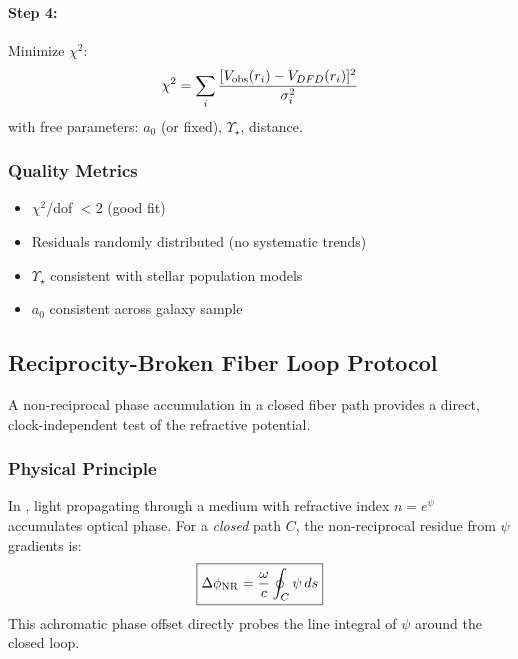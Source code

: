 \paragraph{Step 4:} Minimize $\chi^2$:
\begin{equation}
\chi^2 = \sum_i \frac{[V_{\rm obs}(r_i) - V_{DFD}(r_i)]^2}{\sigma_i^2}
\end{equation}
with free parameters: $a_0$ (or fixed), $\Upsilon_\star$, distance.

\subsubsection{Quality Metrics}

\begin{itemize}
\item $\chi^2$/dof $< 2$ (good fit)
\item Residuals randomly distributed (no systematic trends)
\item $\Upsilon_\star$ consistent with stellar population models
\item $a_0$ consistent across galaxy sample
\end{itemize}

\subsection{Reciprocity-Broken Fiber Loop Protocol}\label{app:fiber_loop}

A non-reciprocal phase accumulation in a closed fiber path provides a direct, 
clock-independent test of the \DFD refractive potential.

\subsubsection{Physical Principle}

In \DFD, light propagating through a medium with refractive index $n = e^\psi$ 
accumulates optical phase. For a \emph{closed} path $C$, the non-reciprocal 
residue from $\psi$ gradients is:
\begin{equation}\label{eq:phi-NR}
\boxed{\Delta\phi_{\rm NR} = \frac{\omega}{c}\oint_C \psi\,ds}
\end{equation}
This achromatic phase offset directly probes the line integral of $\psi$ 
around the closed loop.

